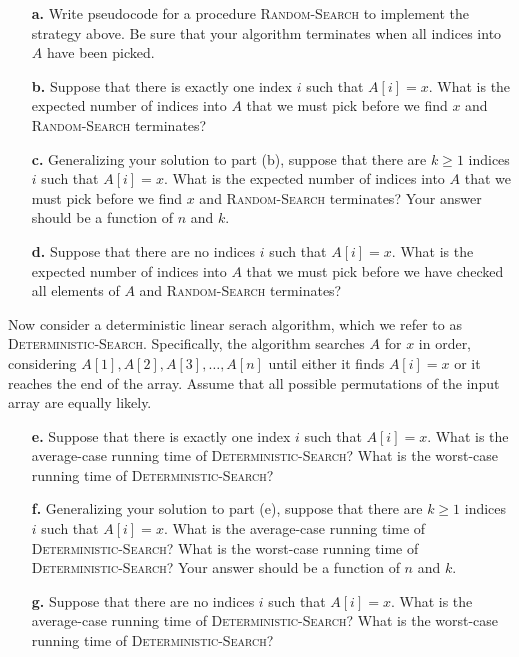 \begin{enumerate}
{\begin{enumerate}
\item[\textbf{a.}] Write pseudocode for a procedure \textsc{Random-Search} to
implement the strategy above. Be sure that your algorithm terminates when all
indices into $A$ have been picked.
\item[\textbf{b.}] Suppose that there is exactly one index $i$ such that
$A[i] = x$. What is the expected number of indices into $A$ that we must pick
before we find $x$ and \textsc{Random-Search} terminates?
\item[\textbf{c.}] Generalizing your solution to part (b), suppose that there
are $k \ge 1$ indices $i$ such that $A[i] = x$. What is the expected number of
indices into $A$ that we must pick before we find $x$ and \textsc{Random-Search}
terminates? Your answer should be a function of $n$ and $k$.
\item[\textbf{d.}] Suppose that there are no indices $i$ such that $A[i] = x$.
What is the expected number of indices into $A$ that we must pick before we
have checked all elements of $A$ and \textsc{Random-Search} terminates?
\end{enumerate}

Now consider a deterministic linear serach algorithm, which we refer to as
\textsc{Deterministic-Search}. Specifically, the algorithm searches $A$ for $x$
in order, considering $A[1], A[2], A[3], \dots, A[n]$ until either it finds
$A[i] = x$ or it reaches the end of the array. Assume that all possible
permutations of the input array are equally likely.

\begin{enumerate}
\item[\textbf{e.}] Suppose that there is exactly one index $i$ such that
$A[i] = x$. What is the average-case running time of
\textsc{Deterministic-Search}?  What is the worst-case running time of
\textsc{Deterministic-Search}?
\item[\textbf{f.}] Generalizing your solution to part (e), suppose that there
are $k \ge 1$ indices $i$ such that $A[i] = x$. What is the average-case running
time of \textsc{Deterministic-Search}? What is the worst-case running time of
\textsc{Deterministic-Search}? Your answer should be a function of $n$ and $k$.
\item[\textbf{g.}] Suppose that there are no indices $i$ such that $A[i] = x$.
What is the average-case running time of \textsc{Deterministic-Search}? What
is the worst-case running time of \textsc{Deterministic-Search}?
\end{enumerate}

}
\end{enumerate}

